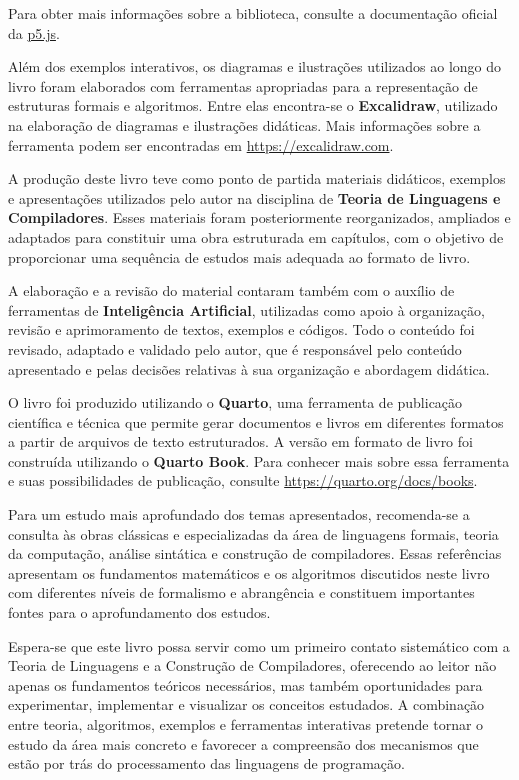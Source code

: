 \documentclass[
  brazilian,
  letterpaper,
]{book}
\theoremstyle{plain}
\theoremstyle{definition}
\theoremstyle{remark}
\begin{document}
Para obter mais informações sobre a biblioteca, consulte a documentação
oficial da \href{https://p5js.org/}{p5.js}.

Além dos exemplos interativos, os diagramas e ilustrações utilizados ao
longo do livro foram elaborados com ferramentas apropriadas para a
representação de estruturas formais e algoritmos. Entre elas encontra-se
o \textbf{Excalidraw}, utilizado na elaboração de diagramas e
ilustrações didáticas. Mais informações sobre a ferramenta podem ser
encontradas em \url{https://excalidraw.com}.

A produção deste livro teve como ponto de partida materiais didáticos,
exemplos e apresentações utilizados pelo autor na disciplina de
\textbf{Teoria de Linguagens e Compiladores}. Esses materiais foram
posteriormente reorganizados, ampliados e adaptados para constituir uma
obra estruturada em capítulos, com o objetivo de proporcionar uma
sequência de estudos mais adequada ao formato de livro.

A elaboração e a revisão do material contaram também com o auxílio de
ferramentas de \textbf{Inteligência Artificial}, utilizadas como apoio à
organização, revisão e aprimoramento de textos, exemplos e códigos. Todo
o conteúdo foi revisado, adaptado e validado pelo autor, que é
responsável pelo conteúdo apresentado e pelas decisões relativas à sua
organização e abordagem didática.

O livro foi produzido utilizando o \textbf{Quarto}, uma ferramenta de
publicação científica e técnica que permite gerar documentos e livros em
diferentes formatos a partir de arquivos de texto estruturados. A versão
em formato de livro foi construída utilizando o \textbf{Quarto Book}.
Para conhecer mais sobre essa ferramenta e suas possibilidades de
publicação, consulte \url{https://quarto.org/docs/books}.

Para um estudo mais aprofundado dos temas apresentados, recomenda-se a
consulta às obras clássicas e especializadas da área de linguagens
formais, teoria da computação, análise sintática e construção de
compiladores. Essas referências apresentam os fundamentos matemáticos e
os algoritmos discutidos neste livro com diferentes níveis de formalismo
e abrangência e constituem importantes fontes para o aprofundamento dos
estudos.

Espera-se que este livro possa servir como um primeiro contato
sistemático com a Teoria de Linguagens e a Construção de Compiladores,
oferecendo ao leitor não apenas os fundamentos teóricos necessários, mas
também oportunidades para experimentar, implementar e visualizar os
conceitos estudados. A combinação entre teoria, algoritmos, exemplos e
ferramentas interativas pretende tornar o estudo da área mais concreto e
favorecer a compreensão dos mecanismos que estão por trás do
processamento das linguagens de programação.
\end{document}
